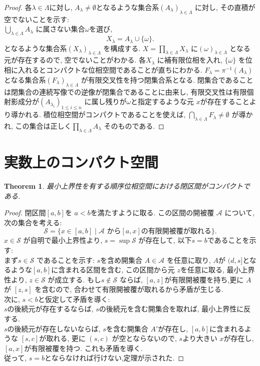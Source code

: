\documentclass[lualatex]{ltjsbook}
\newtheorem{theorem}{Theorem}[section]
\theoremstyle{remark}
\theoremstyle{plain}
\begin{document}
\begin{proof}
	各$\lambda \in \Lambda$に対し, $A_{\lambda} \neq \emptyset$となるような集合系$\left( A_{\lambda} \right) _{\lambda \in \Lambda}$ に対し, その直積が空でないことを示す:\\
	$\bigcup_{\lambda \in  \Lambda} A_{\lambda}$ に属さない集合$\omega$を選び,
	 \[
	X_{\lambda }= A_{\lambda} \cup \{ \omega\} 
	.\] 
	となるような集合系$\left( X_{\lambda} \right) _{\lambda \in \Lambda}$ を構成する. $X = \prod_{\lambda \in \Lambda} X_{\lambda}  $ に$(\omega)_{\lambda \in \Lambda}$ となる元が存在するので, 空でないことがわかる. 各$X_{\lambda}$ に補有限位相を入れ, $\{\omega\} $ を位相に入れるとコンパクトな位相空間であることが直ちにわかる. $F_{\lambda} = \pi ^{-1} \left( A_{\lambda} \right) $ となる集合系$\left( F_{\lambda} \right) _{\lambda \in \Lambda}$ が有限交叉性を持つ閉集合系となる. 閉集合であることは閉集合の連続写像での逆像が閉集合であることに由来し, 有限交叉性は有限個射影成分が$(A_{\lambda_i})_{1\le i \le n}$ に属し残りが$\omega$と指定するような元 $x$が存在することより導かれる. 積位相空間がコンパクトであることを使えば, $\bigcap_{\lambda \in \Lambda} F_{\lambda} \neq \emptyset$ が導かれ, この集合は正しく$\prod_{\lambda \in \Lambda} A_{\lambda}$ そのものである. 
\end{proof}


\section{実数上のコンパクト空間}

\begin{theorem}
	最小上界性を有する順序位相空間における閉区間がコンパクトである.
\end{theorem}

\begin{proof}
	閉区間$[a,b]$を $a<b$を満たすように取る. この区間の開被覆 $\mathcal{A}$ について, 次の集合を考える:
	\[
		\mathcal{S} = \{ x \in [a,b]  \mid  \text{$\mathcal{A}$ から$[a,x]$の有限開被覆が取れる}\} 
	.\] 
	$x \in \mathcal{S}$ が自明で最小上界性より, $s = \sup \mathcal{S}$ が存在して, 以下$s =b$であることを示す:\\
	まず$s \in \mathcal{S}$ であることを示す: $s$を含め開集合 $A\in \mathcal{A}$ を任意に取り, $A$が $(d,s]$となるような$[a,b]$に含まれる区間を含む, この区間から元 $z$を任意に取る, 最小上界性より,  $z \in \mathcal{S}$ が成立する. もし$s \not\in \mathcal{S}$ ならば, $[a,z]$が有限開被覆を持ち,更に $A$が $[z,s]$ を含むので, 合わせて有限開被覆が取れるから矛盾が生じる.\\
	次に, $s <b$と仮定して矛盾を導く: \\
	 $s$の後続元が存在するならば,  $s$の後続元を含む開集合を取れば, 最小上界性に反する.\\
	 $s$の後続元が存在しないならば,  $s$を含む開集合 $A'$が存在し,  $[a,b]$に含まれるような $[s,c]$が取れる, 更に $\left( s,c \right) $ が空とならないので, $s$より大きい $x$が存在し,  $[a,x]$が有限被覆を持つ. これも矛盾を導く. \\
	 従って,  $s=b$とならなければ行けない,定理が示された.
\end{proof}
\end{document}
